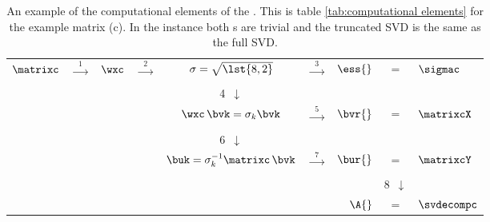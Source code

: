 \clearpage
\thispagestyle{empty}
\begin{landscape}

\begin{table}[htdp]
\caption[An example of the computational elements of the \asvd]{An example of the computational elements of the \asvd. This is table \eqref{tab:computational elements} for the example matrix (c). In the instance both \ns s are trivial and the truncated SVD is the same as the full SVD.}
\begin{center}
\begin{tabular}{ccccccrcl}
%
  $\matrixc$   & $\xrightarrow[]{ \phantom{1} 1 \phantom{1} }$ 
& $\wxc$ & $\xrightarrow[]{ \phantom{1} 2 \phantom{1} }$ 
& $\sigma = \sqrt{ \lst{8, 2} } $ & $\xrightarrow[]{ \phantom{1} 3 \phantom{1} }$
& $\ess{}$ &=& $\sigmac$ \\[20pt]
%
&&&& {\scriptsize{4}}\ $\downarrow$\\[15pt]
%
&&&& $\wxc\, \bvk = \sigma_{k} \bvk$ & $\xrightarrow[]{ \phantom{1} 5 \phantom{1} }$ 
& $\bvr{}$ &=& $\matrixcX $ \\[20pt]
%
&&&& {\scriptsize{6}}\ $\downarrow$ \\[10pt]
%
&&&& $\buk = \sigma_{k}^{-1}\matrixc\, \bvk$ & $\xrightarrow[]{ \phantom{1} 7 \phantom{1} }$ 
& $\bur{}$ & = & $\matrixcY $ \\[15pt]
%
&&&&&&& {\small{8}}\ $\downarrow$\\[5pt]
%
&&&&&& $\A{}$  &=& $\svdecompc$ 
%
\end{tabular}
\end{center}
\label{tab:computational elements example}
\end{table}

\end{landscape}


\endinput